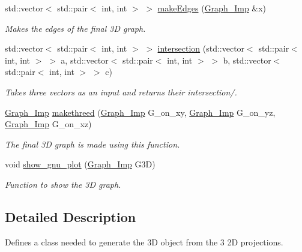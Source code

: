 \begin{DoxyCompactItemize}
std\+::vector$<$ std\+::pair$<$ int, int $>$ $>$ \mbox{\hyperlink{class_two___d__to___three___d_a57df84f034c7e2f0d34449a39e2aa602}{make\+Edges}} (\mbox{\hyperlink{class_graph___imp}{Graph\+\_\+\+Imp}} \&x)
\begin{DoxyCompactList}\small\item\em Makes the edges of the final 3D graph. \end{DoxyCompactList}\item 
\mbox{\label{class_two___d__to___three___d_a073d9f4b39d7d72614a2983d9b1ef8f5}} 
std\+::vector$<$ std\+::pair$<$ int, int $>$ $>$ \mbox{\hyperlink{class_two___d__to___three___d_a073d9f4b39d7d72614a2983d9b1ef8f5}{intersection}} (std\+::vector$<$ std\+::pair$<$ int, int $>$ $>$ a, std\+::vector$<$ std\+::pair$<$ int, int $>$ $>$ b, std\+::vector$<$ std\+::pair$<$ int, int $>$ $>$ c)
\begin{DoxyCompactList}\small\item\em Takes three vectors as an input and returns their intersection/. \end{DoxyCompactList}\item 
\mbox{\hyperlink{class_graph___imp}{Graph\+\_\+\+Imp}} \mbox{\hyperlink{class_two___d__to___three___d_adfa674d5d9cbf192efda76d5b7489bf8}{makethreed}} (\mbox{\hyperlink{class_graph___imp}{Graph\+\_\+\+Imp}} G\+\_\+on\+\_\+xy, \mbox{\hyperlink{class_graph___imp}{Graph\+\_\+\+Imp}} G\+\_\+on\+\_\+yz, \mbox{\hyperlink{class_graph___imp}{Graph\+\_\+\+Imp}} G\+\_\+on\+\_\+xz)
\begin{DoxyCompactList}\small\item\em The final 3D graph is made using this function. \end{DoxyCompactList}\item 
void \mbox{\hyperlink{class_two___d__to___three___d_a6e66e6c3bc964eeff83d126e10d807f1}{show\+\_\+gnu\+\_\+plot}} (\mbox{\hyperlink{class_graph___imp}{Graph\+\_\+\+Imp}} G3D)
\begin{DoxyCompactList}\small\item\em Function to show the 3D graph. \end{DoxyCompactList}\end{DoxyCompactItemize}


\subsection{Detailed Description}
Defines a class needed to generate the 3D object from the 3 2D projections. 

